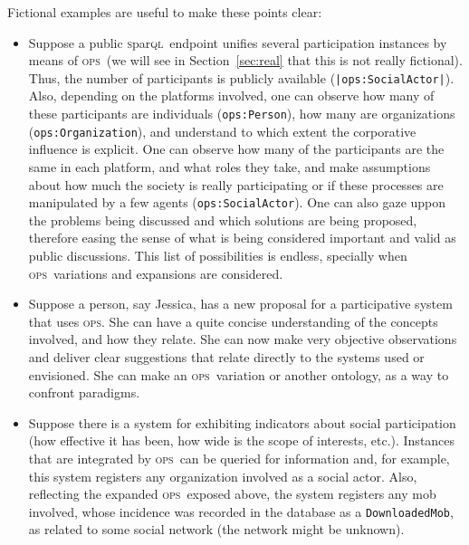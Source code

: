 \documentclass[10pt,letterpaper]{article}
\newcommand{\ops}{\textsc{ops}}
\newcommand{\sparql}{\textsc{s}par\textsc{ql}}
\begin{document}
Fictional examples are useful to make these points clear:
\begin{itemize}
    \item Suppose a public \sparql\ endpoint unifies several participation instances by means of \ops\ (we will see in Section~\ref{sec:real} that this is not really fictional). Thus, the number of participants is publicly available ({\tt |ops:SocialActor|}). Also, depending on the platforms involved, one can observe how many of these participants are individuals ({\tt ops:Person}), how many are organizations ({\tt ops:Organization}), and understand to which extent the corporative influence is explicit. One can observe how many of the participants are the same in each platform, and what roles they take, and make assumptions about how much the society is really participating or if these processes are manipulated by a few agents ({\tt ops:SocialActor}). One can also gaze uppon the problems being discussed and which solutions are being proposed, therefore easing the sense of what is being considered important and valid as public discussions. This list of possibilities is endless, specially when \ops\ variations and expansions are considered.
    \item Suppose a person, say Jessica, has a new proposal for a participative system that uses \ops. She can have a quite concise understanding of the concepts involved, and how they relate. She can now make very objective observations and deliver clear suggestions that relate directly to the systems used or envisioned. She can make an \ops\ variation or another ontology, as a way to confront paradigms.
    \item Suppose there is a system for exhibiting indicators about social participation (how effective it has been, how wide is the scope of interests, etc.). Instances that are integrated by \ops\ can be queried for information and, for example, this system registers any organization involved as a social actor. Also, reflecting the expanded \ops\ exposed above, the system registers any mob involved, whose incidence was recorded in the database as a \texttt{DownloadedMob}, as related to some social network (the network might be unknown).
\end{itemize}
\end{document}
